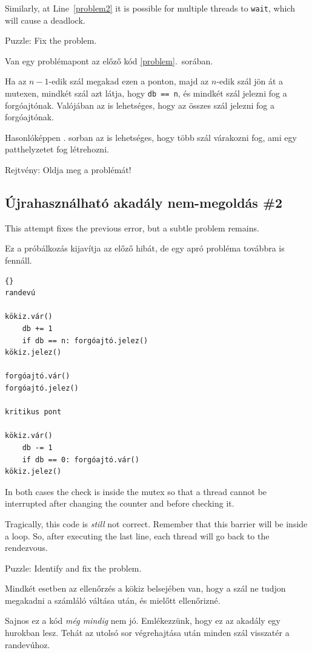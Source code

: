 \documentclass{book}
\newcommand{\clearemptydoublepage}{\newpage\cleardoublepage}
\begin{document}
Similarly, at Line~\ref{problem2} it is possible for multiple
threads to {\tt wait}, which will cause a deadlock.

Puzzle: Fix the problem.

Van egy problémapont az előző kód \ref{problem}.~sorában.

Ha az $n-1$-edik szál megakad ezen a ponton, majd az $n$-edik szál
jön át a mutexen, mindkét szál azt látja, hogy {\tt db == n}, és
mindkét szál jelezni fog a forgóajtónak. Valójában az is lehetséges,
hogy az összes szál jelezni fog a forgóajtónak.

Hasonlóképpen . sorban az is lehetséges, hogy több
szál várakozni fog, ami egy patthelyzetet fog létrehozni.

Rejtvény: Oldja meg a problémát!

\clearemptydoublepage
\subsection {Újrahasználható akadály nem-megoldás \#2}

This attempt fixes the previous error, but a subtle problem
remains.

Ez a próbálkozás kijavítja az előző hibát, de egy apró
probléma továbbra is fennáll.

\begin{lstlisting}[title={Újrahasználható akadály nem-megoldás}]{}
randevú

kökiz.vár()
    db += 1
    if db == n: forgóajtó.jelez() 
kökiz.jelez()

forgóajtó.vár()
forgóajtó.jelez()

kritikus pont

kökiz.vár()
    db -= 1
    if db == 0: forgóajtó.vár()
kökiz.jelez()
\end{lstlisting}

In both cases the check is inside the mutex so that
a thread cannot be interrupted after changing the counter
and before checking it.

Tragically, this code is {\em still} not correct.
Remember that this barrier will be inside a loop.  So, after
executing the last line, each thread will go back
to the rendezvous.

Puzzle: Identify and fix the problem.

Mindkét esetben az ellenőrzés a kökiz belsejében van, hogy a szál
ne tudjon megakadni a számláló váltása után, és mielőtt ellenőrizné.

Sajnos ez a kód {\em még mindig} nem jó. Emlékezzünk, hogy ez az akadály
egy hurokban lesz. Tehát az utolsó sor végrehajtása után minden
szál visszatér a randevúhoz.
\end{document}
